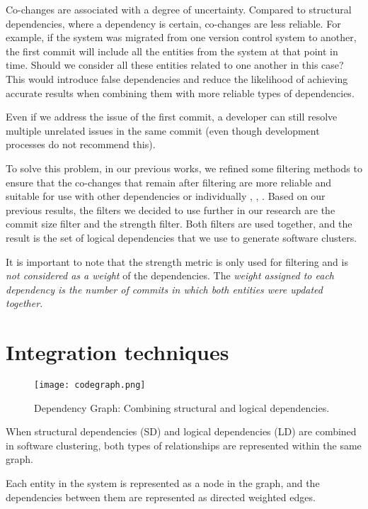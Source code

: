 Co-changes are associated with a degree of uncertainty. Compared to structural dependencies, where a dependency is certain, co-changes are less reliable. For example, if the system was migrated from one version control system to another, the first commit will include all the entities from the system at that point in time. Should we consider all these entities related to one another in this case? This would introduce false dependencies and reduce the likelihood of achieving accurate results when combining them with more reliable types of dependencies.

Even if we address the issue of the first commit, a developer can still resolve multiple unrelated issues in the same commit (even though development processes do not recommend this).

To solve this problem, in our previous works, we refined some filtering methods to ensure that the co-changes that remain after filtering are more reliable and suitable for use with other dependencies or individually \cite{b4}, \cite{DepSACI}, \cite{enase19}. Based on our previous results, the filters we decided to use further in our research are the commit size filter and the strength filter. Both filters are used together, and the result is the set of logical dependencies that we use to generate software clusters.

It is important to note that the strength metric is only used for filtering and is \textit{not considered as a weight} of the dependencies. The \textit{weight assigned to each dependency is the number of commits in which both entities were updated together}.



\section{Integration techniques}
\label{sec:integration_techniques}



\begin{figure}[t!]
  \centering
  \texttt{[image: codegraph.png]}
  \caption{Dependency Graph: Combining structural and logical dependencies.}
  \label{fig:codegraph}
\end{figure}

When structural dependencies (SD) and logical dependencies (LD) are combined in software clustering, both types of relationships are represented within the same graph.

Each entity in the system is represented as a node in the graph, and the dependencies between them are represented as directed weighted edges.

